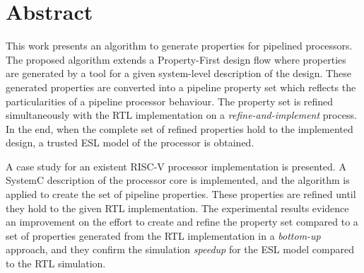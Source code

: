 \chapter{Abstract}

This work presents an algorithm to generate properties for pipelined processors. The proposed algorithm extends a Property-First design flow where properties are generated by a tool for a given system-level description of the design. These generated properties are converted into a pipeline property set which reflects the particularities of a pipeline processor behaviour. The property set is refined simultaneously with the RTL implementation on a \textit{refine-and-implement} process. In the end, when the complete set of refined properties hold to the implemented design, a trusted ESL model of the processor is obtained. 

A case study for an existent RISC-V processor implementation is presented. A SystemC description of the processor core is implemented, and the algorithm is applied to create the set of pipeline properties. These properties are refined until they hold to the given RTL implementation. The experimental results evidence an improvement on the effort to create and refine the property set compared to a set of properties generated from the RTL implementation in a \textit{bottom-up} approach, and they confirm the simulation \textit{speedup} for the ESL model compared to the RTL simulation.
